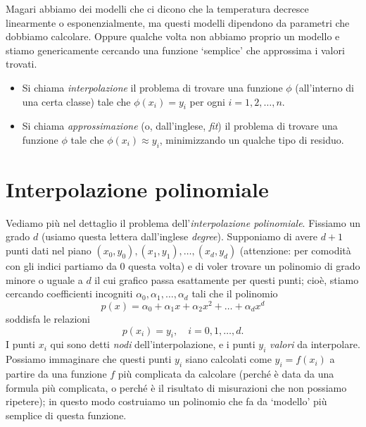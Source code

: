 \documentclass[a4paper]{report}
\theoremstyle{definiton}
\theoremstyle{remark}
\begin{document}
Magari abbiamo dei modelli che ci dicono che la temperatura decresce linearmente o esponenzialmente, ma questi modelli dipendono da parametri che dobbiamo calcolare. Oppure qualche volta non abbiamo proprio un modello e stiamo genericamente cercando una funzione `semplice' che approssima i valori trovati.

\begin{itemize}
    \item Si chiama \emph{interpolazione} il problema di trovare una funzione $\phi$ (all'interno di una certa classe) tale che $\phi(x_i) = y_i$ per ogni $i=1,2,\dots, n$.
    \item Si chiama \emph{approssimazione} (o, dall'inglese, \emph{fit}) il problema di trovare una funzione $\phi$ tale che $\phi(x_i) \approx y_i$, minimizzando un qualche tipo di residuo.
\end{itemize}

\section{Interpolazione polinomiale}

Vediamo più nel dettaglio il problema dell'\emph{interpolazione polinomiale}. Fissiamo un grado $d$ (usiamo questa lettera dall'inglese \emph{degree}). Supponiamo di avere $d+1$ punti dati nel piano $(x_0, y_0), (x_1, y_1), \dots, (x_{d}, y_{d})$ (attenzione: per comodità con gli indici partiamo da $0$ questa volta) e di voler trovare un polinomio di grado minore o uguale a $d$ il cui grafico passa esattamente per questi punti; cioè, stiamo cercando coefficienti incogniti $\alpha_0, \alpha_1, \dots, \alpha_d$ tali che il polinomio
\[
p(x) = \alpha_0 + \alpha_1 x + \alpha_2 x^2 + \dots + \alpha_d x^d
\]
soddisfa le relazioni
\begin{equation} \label{interpolazione_polinomiale}
p(x_i) = y_i, \quad i=0,1,\dots,d.
\end{equation}
I punti $x_i$ qui sono detti \emph{nodi} dell'interpolazione, e i punti $y_i$ \emph{valori} da interpolare. Possiamo immaginare che questi punti $y_i$ siano calcolati come $y_i = f(x_i)$ a partire da una funzione $f$ più complicata da calcolare (perché è data da una formula più complicata, o perché è il risultato di misurazioni che non possiamo ripetere); in questo modo costruiamo un polinomio che fa da `modello' più semplice di questa funzione.
\end{document}

